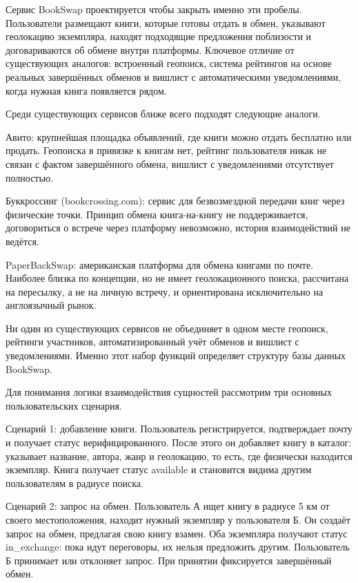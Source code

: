 \documentclass[14pt,a4paper]{extarticle}
\begin{document}
Сервис BookSwap проектируется чтобы закрыть именно эти пробелы.
Пользователи размещают книги, которые готовы отдать в обмен, указывают
геолокацию экземпляра, находят подходящие предложения поблизости и
договариваются об обмене внутри платформы. Ключевое отличие от
существующих аналогов: встроенный геопоиск, система рейтингов на основе
реальных завершённых обменов и вишлист с автоматическими уведомлениями,
когда нужная книга появляется рядом.

Среди существующих сервисов ближе всего подходят следующие аналоги.

Авито: крупнейшая площадка объявлений, где книги можно отдать бесплатно
или продать. Геопоиска в привязке к книгам нет, рейтинг пользователя
никак не связан с фактом завершённого обмена, вишлист с уведомлениями
отсутствует полностью.

Буккроссинг (bookcrossing.com): сервис для безвозмездной передачи книг
через физические точки. Принцип обмена книга-на-книгу не поддерживается,
договориться о встрече через платформу невозможно, история
взаимодействий не ведётся.

PaperBackSwap: американская платформа для обмена книгами по почте.
Наиболее близка по концепции, но не имеет геолокационного поиска,
рассчитана на пересылку, а не на личную встречу, и ориентирована
исключительно на англоязычный рынок.

Ни один из существующих сервисов не объединяет в одном месте геопоиск,
рейтинги участников, автоматизированный учёт обменов и вишлист с
уведомлениями. Именно этот набор функций определяет структуру базы
данных BookSwap.

Для понимания логики взаимодействия сущностей рассмотрим три основных
пользовательских сценария.

Сценарий 1: добавление книги. Пользователь регистрируется, подтверждает
почту и получает статус верифицированного. После этого он добавляет
книгу в каталог: указывает название, автора, жанр и геолокацию, то есть,
где физически находится экземпляр. Книга получает статус available и
становится видима другим пользователям в радиусе поиска.

Сценарий 2: запрос на обмен. Пользователь А ищет книгу в радиусе 5 км от
своего местоположения, находит нужный экземпляр у пользователя Б. Он
создаёт запрос на обмен, предлагая свою книгу взамен. Оба экземпляра
получают статус in\_exchange: пока идут переговоры, их нельзя предложить
другим. Пользователь Б принимает или отклоняет запрос. При принятии
фиксируется завершённый обмен.
\end{document}

